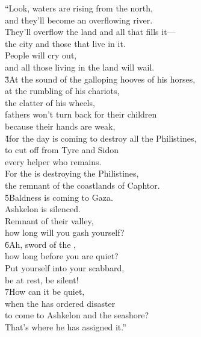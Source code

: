 \begin{poetry}
\poeml ``Look, waters are rising from the north, \\
\poemll    and they'll become an overflowing river. \\
\poeml They'll overflow the land and all that fills it--- \\
\poemll    the city and those that live in it. \\
\poeml People will cry out, \\
\poemll    and all those living in the land will wail. \\
\poeml \v{3}At the sound of the galloping hooves of his horses, \\
\poemll    at the rumbling of his chariots, \\
\poemlll       the clatter of his wheels, \\
\poeml fathers won't turn back for their children \\
\poemll    because their hands are weak, \\
\poeml \v{4}for the day is coming to destroy all the Philistines, \\
\poemll    to cut off from Tyre and Sidon \\
\poemlll       every helper who remains. \\
\poeml For the  is destroying the Philistines, \\
\poemll    the remnant of the coastlands of Caphtor. \\
\poeml \v{5}Baldness is coming to Gaza. \\
\poemll    Ashkelon is silenced. \\
\poeml Remnant of their valley, \\
\poemll    how long will you gash yourself? \\
\poeml \v{6}Ah, sword of the , \\
\poemll    how long before you are quiet? \\
\poeml Put yourself into your scabbard, \\
\poemll    be at rest, be silent! \\
\poeml \v{7}How can it be quiet, \\
\poemll    when the  has ordered disaster \\
\poeml to come to Ashkelon and the seashore? \\
\poemll    That's where he has assigned it.''
\end{poetry}

